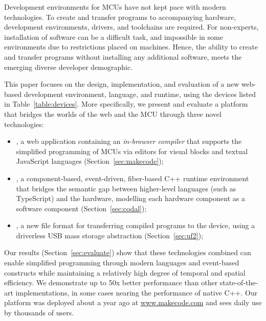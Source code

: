Development environments for MCUs have not kept pace with modern technologies. To create and transfer programs to accompanying hardware, development environments, drivers, and toolchains are required. For non-experts, installation of software can be a difficult task, and impossible in some environments due to restrictions placed on machines. Hence, the ability to create and transfer programs without installing any additional software, meets the emerging diverse developer demographic.

This paper focuses on the design, implementation, and evaluation of a new web-based development environment, language, and runtime, using the devices listed in Table~\ref{table:devices}. More specifically, we present and evaluate a platform that bridges the worlds of the web and the MCU through three novel technologies:

\begin{itemize}
\item \emph{\MCN}, a web application containing an \emph{in-browser compiler} that supports the simplified programming of MCUs via editors for visual blocks and textual JavaScript languages (Section~\ref{sec:makecode});

\item \emph{\CO}, a component-based, event-driven, fiber-based C++ runtime environment that bridges the semantic gap between higher-level languages (such as TypeScript) and the hardware, modelling each hardware component as a software component (Section~\ref{sec:codal});

\item \emph{\UF}, a new file format for transferring compiled programs to the device, using a driverless USB mass storage abstraction (Section~\ref{sec:uf2});

\end{itemize}

Our results (Section~\ref{sec:evaluate}) show that these technologies combined can enable simplified programming through modern languages and event-based constructs while maintaining a relatively high degree of temporal and spatial efficiency. We demonstrate up to 50x better performance than other state-of-the-art implementations,
in some cases nearing the performance of native C++. Our platform was deployed about a year ago at \url{www.makecode.com} and sees daily use by thousands of users.



